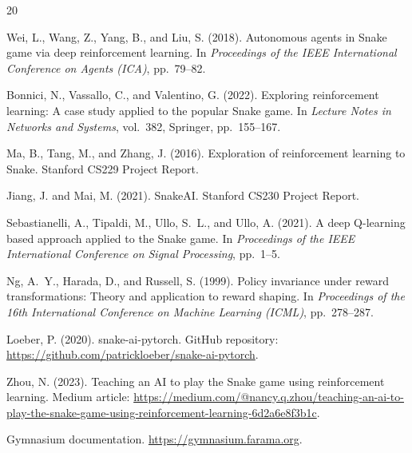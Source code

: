 \documentclass[11pt]{article}
\begin{document}
\begin{thebibliography}{20}

Wei, L., Wang, Z., Yang, B., and Liu, S. (2018).
\newblock Autonomous agents in Snake game via deep reinforcement learning.
\newblock In \emph{Proceedings of the IEEE International Conference on Agents (ICA)}, pp.\ 79--82.

Bonnici, N., Vassallo, C., and Valentino, G. (2022).
\newblock Exploring reinforcement learning: A case study applied to the popular Snake game.
\newblock In \emph{Lecture Notes in Networks and Systems}, vol.\ 382, Springer, pp.\ 155--167.

Ma, B., Tang, M., and Zhang, J. (2016).
\newblock Exploration of reinforcement learning to Snake.
\newblock Stanford CS229 Project Report.

Jiang, J. and Mai, M. (2021).
\newblock SnakeAI.
\newblock Stanford CS230 Project Report.

Sebastianelli, A., Tipaldi, M., Ullo, S.~L., and Ullo, A. (2021).
\newblock A deep Q-learning based approach applied to the Snake game.
\newblock In \emph{Proceedings of the IEEE International Conference on Signal Processing}, pp.\ 1--5.


Ng, A.~Y., Harada, D., and Russell, S. (1999).
\newblock Policy invariance under reward transformations: Theory and application to reward shaping.
\newblock In \emph{Proceedings of the 16th International Conference on Machine Learning (ICML)}, pp.\ 278--287.


Loeber, P. (2020).
\newblock snake-ai-pytorch.
\newblock GitHub repository: \url{https://github.com/patrickloeber/snake-ai-pytorch}.

Zhou, N. (2023).
\newblock Teaching an AI to play the Snake game using reinforcement learning.
\newblock Medium article: \url{https://medium.com/@nancy.q.zhou/teaching-an-ai-to-play-the-snake-game-using-reinforcement-learning-6d2a6e8f3b1c}.

Gymnasium documentation.
\newblock \url{https://gymnasium.farama.org}.

\end{thebibliography}
\end{document}
